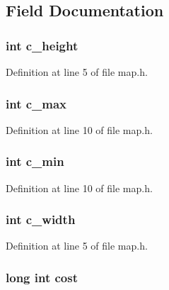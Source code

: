 \subsection{Field Documentation}
\hypertarget{structmap__t_a2aa8ffa89bb8f194715ce066b1765a98}{
\subsubsection[{c\-\_\-height}]{\setlength{\rightskip}{0pt plus 5cm}int c\-\_\-height}}\label{structmap__t_a2aa8ffa89bb8f194715ce066b1765a98}


Definition at line 5 of file map.\-h.

\hypertarget{structmap__t_ad9249b2bdb316c332e2d908dda59be80}{
\subsubsection[{c\-\_\-max}]{\setlength{\rightskip}{0pt plus 5cm}int c\-\_\-max}}\label{structmap__t_ad9249b2bdb316c332e2d908dda59be80}


Definition at line 10 of file map.\-h.

\hypertarget{structmap__t_a34595983613ed34306b3d58f311978e4}{
\subsubsection[{c\-\_\-min}]{\setlength{\rightskip}{0pt plus 5cm}int c\-\_\-min}}\label{structmap__t_a34595983613ed34306b3d58f311978e4}


Definition at line 10 of file map.\-h.

\hypertarget{structmap__t_af756930ecb58336c993cf9a50e64d5fd}{
\subsubsection[{c\-\_\-width}]{\setlength{\rightskip}{0pt plus 5cm}int c\-\_\-width}}\label{structmap__t_af756930ecb58336c993cf9a50e64d5fd}


Definition at line 5 of file map.\-h.

\hypertarget{structmap__t_a9f2dafabe0c6f59d1b086dda0c1dd0d6}{
\subsubsection[{cost}]{\setlength{\rightskip}{0pt plus 5cm}long int cost}}\label{structmap__t_a9f2dafabe0c6f59d1b086dda0c1dd0d6}


